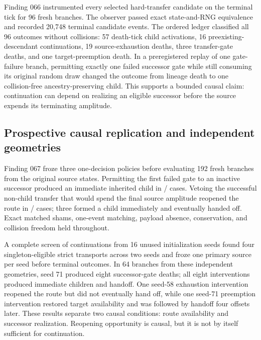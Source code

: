 Finding 066 instrumented every selected hard-transfer candidate on the terminal
tick for 96 fresh branches. The observer passed exact state-and-RNG equivalence
and recorded 20,748 terminal candidate events. The ordered ledger classified all
96 outcomes without collisions: 57 death-tick child activations, 16
preexisting-descendant continuations, 19 source-exhaustion deaths, three
transfer-gate deaths, and one target-preemption death. In a preregistered replay
of one gate-failure branch, permitting exactly one failed successor gate while
still consuming its original random draw changed the outcome from lineage death
to one collision-free ancestry-preserving child. This supports a bounded causal
claim: continuation can depend on realizing an eligible successor before the
source expends its terminating amplitude.

\subsection{Prospective causal replication and independent geometries}

Finding 067 froze three one-decision policies before evaluating 192 fresh
branches from the original source states. Permitting the first failed gate to an
inactive successor produced an immediate inherited child in
\GCEightSameGateRescues{}/\GCEightSameGateCases{} cases. Vetoing the successful
non-child transfer that would spend the final source amplitude reopened the
route in \GCEightSameExhaustRoutes{}/\GCEightSameExhaustCases{} cases; three
formed a child immediately and \GCEightSameExhaustHandoffs{} eventually handed
off. Exact matched shams, one-event matching, payload absence, conservation, and
collision freedom held throughout.

A complete screen of \GCEightScreenCases{} continuations from 16 unused
initialization seeds found four singleton-eligible strict transports across two
seeds and froze one primary source per seed before terminal outcomes. In 64
branches from these \GCEightIndependentSources{} independent geometries, seed 71
produced eight successor-gate deaths; all eight interventions produced immediate
children and handoff. One seed-58 exhaustion intervention reopened the route but
did not eventually hand off, while one seed-71 preemption intervention restored
target availability and was followed by handoff four offsets later. These
results separate two causal conditions: route availability and successor
realization. Reopening opportunity is causal, but it is not by itself sufficient
for continuation.

